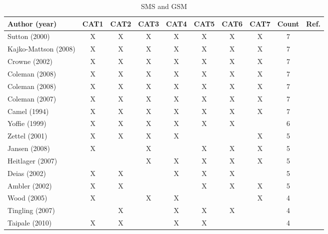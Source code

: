 \documentclass[10pt,journal,letterpaper,compsoc]{IEEEtran}
\begin{document}
\begin{table}[!t]
\renewcommand{\arraystretch}{1.3}
\caption{SMS \cite{SMS} and GSM} 
\label{tab:an:literature_comp}
\centering
\begin{tabular}{|l||c||c||c||c||c||c||c||c||c|}

    \hline
    Author (year) & CAT1  & CAT2  & CAT3  & CAT4  & CAT5  & CAT6  & CAT7  & Count & Ref. \\
\hline
Sutton (2000) & X     & X     & X     & X     & X     & X     & X     & 7     & \cite{Sutton2000} \\
Kajko-Mattson (2008) & X     & X     & X     & X     & X     & X     & X     & 7     & \cite{Kajko-Mattsson2008} \\
Crowne (2002) & X     & X     & X     & X     & X     & X     & X     & 7     & \cite{Crowne2002} \\
Coleman (2008) & X     & X     & X     & X     & X     & X     & X     & 7     & \cite{Coleman2008a} \\
Coleman (2008) & X     & X     & X     & X     & X     & X     & X     & 7     & \cite{Coleman2008} \\
Coleman (2007) & X     & X     & X     & X     & X     & X     & X     & 7     & \cite{Coleman2007} \\
Camel (1994) & X     & X     & X     & X     & X     & X     & X     & 7     & \cite{Camel1994a} \\
Yoffie (1999) & X     & X     & X     & X     & X     & X     &       & 6     & \cite{Yoffie1999} \\
Zettel (2001) & X     & X     & X     & X     &       &       & X     & 5     & \cite{Zettel2001} \\
Jansen (2008) & X     &       & X     &       & X     & X     & X     & 5     & \cite{Jansen2008} \\
Heitlager (2007) &       &       & X     & X     & X     & X     & X     & 5     & \cite{Heitlager2007} \\
Deias  (2002) & X     & X     &       & X     & X     & X     &       & 5     & \cite{Deias} \\
Ambler (2002) & X     & X     &       &       & X     & X     & X     & 5     & \cite{Ambler2002} \\
Wood (2005) & X     &       & X     & X     &       &       & X     & 4     & \cite{Wood2005} \\
Tingling (2007) &       & X     &       & X     & X     & X     &       & 4     & \cite{Tingling2007} \\
Taipale (2010) & X     & X     &       & X     & X     &       &       & 4     & \cite{Taipale2010} \\

\end{tabular}
\end{table}
\end{document}
